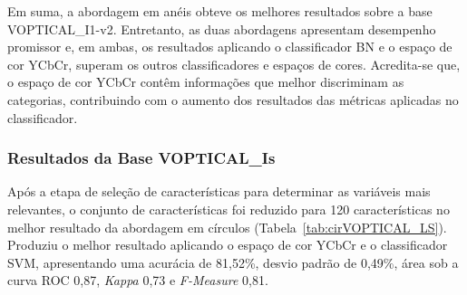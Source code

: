 Em suma, a abordagem em anéis obteve os melhores resultados sobre a base VOPTICAL\_I1-v2. Entretanto, as duas abordagens apresentam desempenho promissor e, em ambas, os resultados aplicando o classificador BN e o espaço de cor YCbCr, superam os outros classificadores e espaços de cores. Acredita-se que, o espaço de cor YCbCr contêm informações que melhor discriminam as categorias, contribuindo com o aumento dos resultados das métricas aplicadas no classificador.

\subsubsection{Resultados da Base VOPTICAL\_Is}

Após a etapa de seleção de características para determinar as
variáveis mais relevantes, o conjunto de características foi reduzido para 120 características no melhor resultado da abordagem em círculos (Tabela~\ref{tab:cirVOPTICAL_LS}). Produziu o melhor resultado aplicando o espaço de cor YCbCr e o classificador SVM, apresentando uma acurácia de 81,52\%, desvio padrão de 0,49\%, área sob a curva ROC 0,87, \textit{Kappa} 0,73 e \textit{F-Measure} 0,81.

